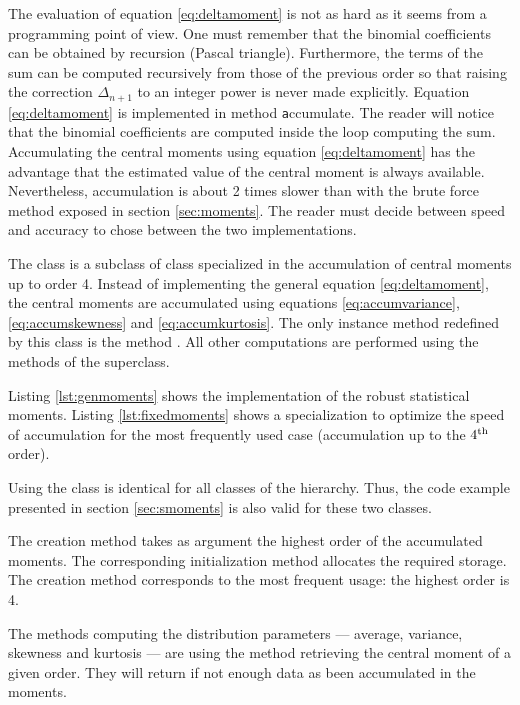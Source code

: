 The evaluation of equation \ref{eq:deltamoment} is not as hard as
it seems from a programming point of view.
One must remember that the binomial coefficients can be obtained by recursion (Pascal triangle).
Furthermore, the terms of the sum can be computed recursively from those of the previous order so that raising the correction $\Delta_{n+1}$ to an integer power is never made explicitly.
Equation \ref{eq:deltamoment} is implemented in method {\texttt accumulate}.
The reader will notice that the binomial coefficients are computed inside the loop
computing the sum.
Accumulating the central moments using equation \ref{eq:deltamoment} has the
advantage that the estimated value of the central moment is always available.
Nevertheless, accumulation is about 2 times slower than with the brute force
method exposed in section \ref{sec:moments}.
The reader must decide between speed and accuracy to chose between the two implementations.

The class  is a subclass of class  specialized in the accumulation of central moments up to order 4.
Instead of implementing the general equation \ref{eq:deltamoment}, the central moments are accumulated using equations \ref{eq:accumvariance}, \ref{eq:accumskewness} and \ref{eq:accumkurtosis}.
The only instance method redefined by this class is the method .
All other computations are performed using the methods of the superclass.

\label{sec:srobustmoment} Listing \ref{lst:genmoments} shows the implementation of the robust statistical moments. Listing \ref{lst:fixedmoments} shows a specialization to optimize the speed of accumulation for the most frequently used case (accumulation up to the $4^{\mathop{\textrm{th}}}$ order).

Using the class is identical for all classes of the hierarchy.
Thus, the code example presented in section \ref{sec:smoments} is also valid for these two classes.

The creation method  takes as argument the highest order of the accumulated moments.
The corresponding initialization method allocates the required storage.
The creation method  corresponds to the most frequent usage: the highest order is 4.

The methods computing the distribution parameters --- average, variance, skewness and kurtosis --- are using the method  retrieving the central moment of a given order.
They will return  if not enough data as been accumulated in the moments.

